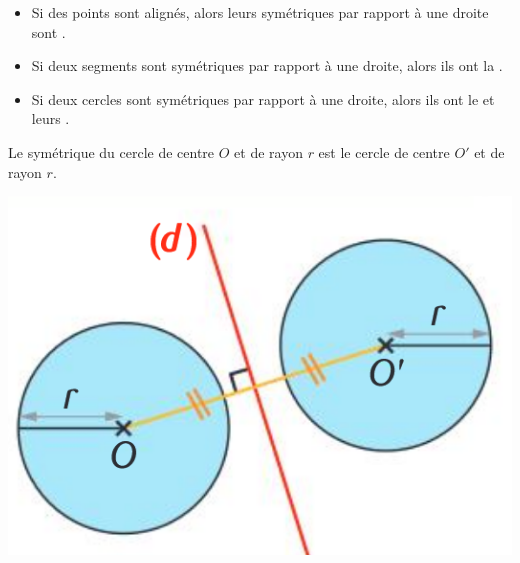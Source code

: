 \documentclass[xcolor={dvipsnames}]{beamer}
\begin{document}
\begin{frame}
	\begin{myprops}
		\begin{itemize}
			\item Si des points sont alignés, alors leurs symétriques par rapport à une droite sont .
			\item Si deux segments sont symétriques par rapport à une droite, alors ils ont la .
			\item Si deux cercles sont symétriques par rapport à une droite, alors ils ont le  et leurs .
		\end{itemize}
		
	\end{myprops}
	
	\begin{myexs}
		Le symétrique du cercle de centre $O$ et de rayon $r$ est le cercle de centre $O'$ et de rayon $r$.
		
		\begin{center}
			\includegraphics[scale=0.25]{prop3}
		\end{center}
	\end{myexs}
\end{frame}
\end{document}
